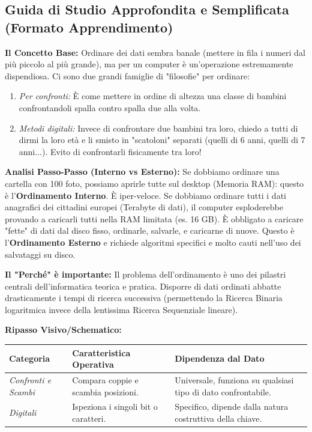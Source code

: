 \documentclass[a4paper, 11pt]{report}
\begin{document}
\vspace{0.5cm}
\subsection*{Guida di Studio Approfondita e Semplificata (Formato Apprendimento)}

\textbf{Il Concetto Base:}
Ordinare dei dati sembra banale (mettere in fila i numeri dal più piccolo al più grande), ma per un computer è un'operazione estremamente dispendiosa. Ci sono due grandi famiglie di "filosofie" per ordinare:
\begin{enumerate}
    \item \textit{Per confronti:} È come mettere in ordine di altezza una classe di bambini confrontandoli spalla contro spalla due alla volta.
    \item \textit{Metodi digitali:} Invece di confrontare due bambini tra loro, chiedo a tutti di dirmi la loro età e li smisto in "scatoloni" separati (quelli di 6 anni, quelli di 7 anni...). Evito di confrontarli fisicamente tra loro!
\end{enumerate}

\textbf{Analisi Passo-Passo (Interno vs Esterno):}
Se dobbiamo ordinare una cartella con 100 foto, possiamo aprirle tutte sul desktop (Memoria RAM): questo è l'\textbf{Ordinamento Interno}. È iper-veloce.
Se dobbiamo ordinare tutti i dati anagrafici dei cittadini europei (Terabyte di dati), il computer esploderebbe provando a caricarli tutti nella RAM limitata (es. 16 GB). È obbligato a caricare "fette" di dati dal disco fisso, ordinarle, salvarle, e caricarne di nuove. Questo è l'\textbf{Ordinamento Esterno} e richiede algoritmi specifici e molto cauti nell'uso dei salvataggi su disco.

\textbf{Il "Perché" è importante:}
Il problema dell'ordinamento è uno dei pilastri centrali dell'informatica teorica e pratica. Disporre di dati ordinati abbatte drasticamente i tempi di ricerca successiva (permettendo la Ricerca Binaria logaritmica invece della lentissima Ricerca Sequenziale lineare).

\textbf{Ripasso Visivo/Schematico:}
\begin{center}
\begin{tabular}{|l|l|p{6cm}|}
\hline
\textbf{Categoria} & \textbf{Caratteristica Operativa} & \textbf{Dipendenza dal Dato} \\
\hline
\textit{Confronti e Scambi} & Compara coppie e scambia posizioni. & Universale, funziona su qualsiasi tipo di dato confrontabile. \\
\hline
\textit{Digitali} & Ispeziona i singoli bit o caratteri. & Specifico, dipende dalla natura costruttiva della chiave. \\
\hline
\end{tabular}
\end{center}
\end{document}
